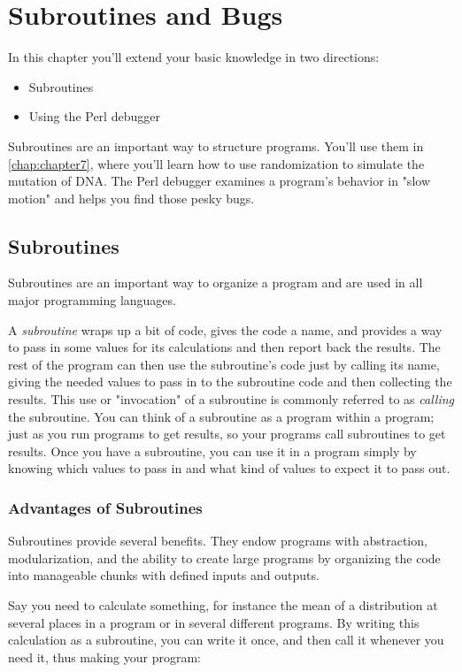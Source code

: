 \chapter{Subroutines and Bugs}
\label{chap:chapter6}
\minitoc

In this chapter you'll extend your basic knowledge in two directions:

\begin{itemize}
  \item Subroutines
  \item Using the Perl debugger
\end{itemize}

Subroutines are an important way to structure programs. You'll use them in \autoref{chap:chapter7}, where you'll learn how to use randomization to simulate the mutation of DNA. The Perl debugger examines a program's behavior in "slow motion" and helps you find those pesky bugs. 

\section{Subroutines}
Subroutines are an important way to organize a program and are used in all major programming languages.

A \textit{subroutine} wraps up a bit of code, gives the code a name, and provides a way to pass in some values for its calculations and then report back the results. The rest of the program can then use the subroutine's code just by calling its name, giving the needed values to pass in to the subroutine code and then collecting the results. This use or "invocation" of a subroutine is commonly referred to as \textit{calling} the subroutine. You can think of a subroutine as a program within a program; just as you run programs to get results, so your programs call subroutines to get results. Once you have a subroutine, you can use it in a program simply by knowing which values to pass in and what kind of values to expect it to pass out. 

\subsection{Advantages of Subroutines}
Subroutines provide several benefits. They endow programs with abstraction, modularization, and the ability to create large programs by organizing the code into manageable chunks with defined inputs and outputs.

Say you need to calculate something, for instance the mean of a distribution at several places in a program or in several different programs. By writing this calculation as a subroutine, you can write it once, and then call it whenever you need it, thus making your program: 

